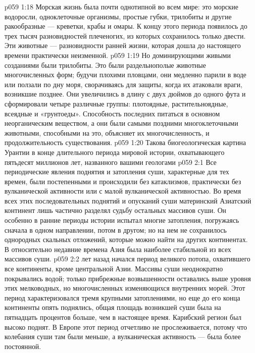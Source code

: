 \vs p059 1:18 \pc Морская жизнь была почти однотипной во всем мире: это морские водоросли, одноклеточные организмы, простые губки, трилобиты и другие ракообразные --- креветки, крабы и омары. К концу этого периода появилось до трех тысяч разновидностей плеченогих, из которых сохранилось только двести. Эти животные --- разновидности ранней жизни, которая дошла до настоящего времени практически неизменной.
\vs p059 1:19 Но доминирующими живыми созданиями были трилобиты. Это были раздельнополые животные многочисленных форм; будучи плохими пловцами, они медленно парили в воде или ползали по дну моря, сворачиваясь для защиты, когда их атаковали враги, возникшие позднее. Они увеличились в длину с двух дюймов до одного фута и сформировали четыре различные группы: плотоядные, растительноядные, всеядные и «грунтоеды». Способность последних питаться в основном неорганическим веществом, а они были самыми поздними многоклеточными животными, способными на это, объясняет их многочисленность, и продолжительность существования.
\vs p059 1:20 Такова биогеологическая картина Урантии в конце длительного периода мировой истории, охватывающего пятьдесят миллионов лет, названного вашими геологами 
\vs p059 2:1 Все периодические явления поднятия и затопления суши, характерные для тех времен, были постепенными и происходили без катаклизмов, практически без вулканической активности или с малой вулканической активностью. Во время всех этих последовательных поднятий и опусканий суши материнский Азиатский континент лишь частично разделял судьбу остальных массивов суши. Он особенно в ранние периоды истории испытал многие затопления, погружаясь сначала в одном направлении, потом в другом; но на нем не сохранилось однородных скальных отложений, которые можно найти на других континентах. В относительно недавние времена Азия была наиболее стабильной из всех массивов суши.
\vs p059 2:2 \pc {} лет назад начался период великого потопа, охватившего все континенты, кроме центральной Азии. Массивы суши неоднократно покрывались водой; только прибрежные возвышенности оставались выше уровня этих мелководных, но многочисленных изменяющихся внутренних морей. Этот период характеризовался тремя крупными затоплениями, но еще до его конца континенты опять поднялись, общая площадь возникшей суши была на пятнадцать процентов больше, чем в настоящее время. Карибский регион был высоко поднят. В Европе этот период отчетливо не прослеживается, потому что колебания суши там были меньше, а вулканическая активность --- была более постоянной.
